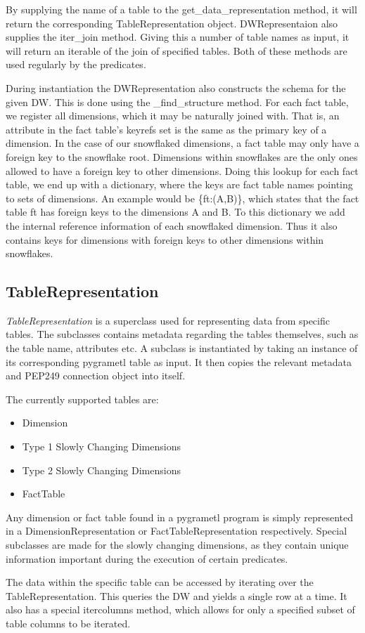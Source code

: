 By supplying the name of a table to the get\_data\_representation method, it will return the corresponding TableRepresentation object. DWRepresentaion also supplies the iter\_join method. Giving this a number of table names as input, it will return an iterable of the join of specified tables. Both of these methods are used regularly by the predicates.

During instantiation the DWRepresentation also constructs the schema for the given DW. This is done using the \_find\_structure method. For each fact table, we register all dimensions, which it may be naturally joined with. That is, an attribute in the fact table’s keyrefs set is the same as the primary key of a dimension. In the case of our snowflaked dimensions, a fact table may only have a foreign key to the snowflake root. Dimensions within snowflakes are the only ones allowed to have a foreign key to other dimensions. Doing this lookup for each fact table, we end up with a dictionary, where the keys are fact table names pointing to sets of dimensions. An example would be \{ft:(A,B)\}, which states that the fact table ft has foreign keys to the dimensions A and B. To this dictionary we add the internal reference information of each snowflaked dimension. Thus it also contains keys for dimensions with foreign keys to other dimensions within snowflakes.

\subsection{TableRepresentation}
\textit{TableRepresentation} is a superclass used for representing data from specific tables. The subclasses contains metadata regarding the tables themselves, such as the table name, attributes etc. A subclass is instantiated by taking an instance of its corresponding pygrametl table as input. It then copies the relevant metadata and PEP249 connection object into itself.

The currently supported tables are:

\begin{itemize}
\item Dimension
\item Type 1 Slowly Changing Dimensions
\item Type 2 Slowly Changing Dimensions
\item FactTable
\end{itemize}

Any dimension or fact table found in a pygrametl program is simply represented in a DimensionRepresentation or FactTableRepresentation respectively. Special subclasses are made for the slowly changing dimensions, as they contain unique information important during the execution of certain predicates.

The data within the specific table can be accessed by iterating over the TableRepresentation. This queries the DW and yields a single row at a time. It also has a special itercolumns method, which allows for only a specified subset of table columns to be iterated. 







